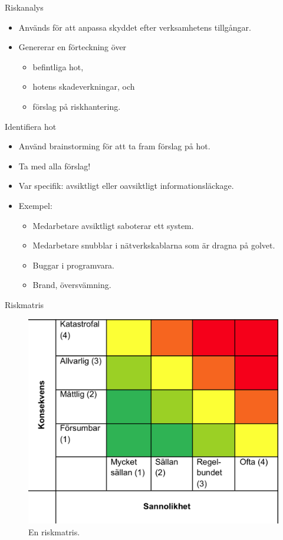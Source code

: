 \documentclass{beamer}
\begin{document}
\begin{frame}{Riskanalys}
  \begin{itemize}
    \item Används för att anpassa skyddet efter verksamhetens tillgångar.
    \item Genererar en förteckning över
      \begin{itemize}
        \item befintliga hot,
        \item hotens skadeverkningar, och
        \item förslag på riskhantering.
      \end{itemize}
  \end{itemize}
\end{frame}

\begin{frame}{Identifiera hot}
  \begin{itemize}
    \item Använd brainstorming för att ta fram förslag på hot.
    \item Ta med alla förslag!
    \item Var specifik: avsiktligt eller oavsiktligt informationsläckage.
    \item Exempel:
      \begin{itemize}
        \item Medarbetare avsiktligt saboterar ett system.
        \item Medarbetare snubblar i nätverkskablarna som är dragna på golvet.
        \item Buggar i programvara.
        \item Brand, översvämning.
      \end{itemize}
  \end{itemize}
\end{frame}

\begin{frame}{Riskmatris}
  \begin{figure}
    \includegraphics[height=0.7\textheight]{riskmatris.png}
    \caption{En riskmatris.}
  \end{figure}
\end{frame}
\end{document}
